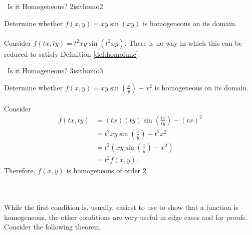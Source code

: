     \begin{example}{\Difficulty\,\Difficulty\,\,Is it Homogeneous? 2}{isithomo2}

        Determine whether \(f(x,y)=xy\sin(xy)\) is homogeneous on its domain.
        \\
        \\
        Consider \(f(tx,ty)=t^2xy\sin(t^2xy)\). There is no way in which this can be reduced to satisfy Definition \ref{def:homofunc}.
    \end{example}
    \pagebreak
    \begin{example}{\Difficulty\,\Difficulty\,\,Is it Homogeneous? 3}{isithomo3}

        Determine whether \(f(x,y)=xy\sin\left(\frac{x}{y}\right)-x^2\) is homogeneous on its domain.
        \\
        \\
        Consider
        \begin{align*}
            f(tx,ty)&=(tx)(ty)\sin\left(\frac{tx}{ty}\right)-(tx)^2 \\
            &=t^2xy\sin\left(\frac{x}{y}\right)-t^2x^2 \\
            &=t^2(xy\sin\left(\frac{x}{y}\right)-x^2) \\
            &=t^2f(x,y).
        \end{align*}
        Therefore, \(f(x,y)\) is homogeneous of order \(2\).
    \end{example}
    \vphantom
    \\
    \\
    While the first condition is, usually, easiest to use to show that a function is homogeneous, the other conditions are very useful in edge cases and for proofs. Consider the following theorem.
